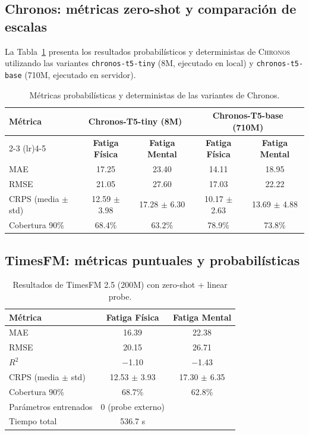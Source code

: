 \documentclass[12pt, a4paper]{article}
\newcommand{\code}[1]{\texttt{#1}}
\newcommand{\chronos}{\textsc{Chronos}}
\begin{document}
\subsection{Chronos: métricas zero-shot y comparación de escalas}

La Tabla~\ref{tab:chronos_metricas} presenta los resultados probabilísticos y deterministas de \chronos{} utilizando las variantes \code{chronos-t5-tiny} (8M, ejecutado en local) y \code{chronos-t5-base} (710M, ejecutado en servidor).

\begin{table}[H]
\centering
\caption{Métricas probabilísticas y deterministas de las variantes de Chronos.}
\label{tab:chronos_metricas}
\small
\begin{tabular}{@{}lcccc@{}}
\toprule
\multirow{2}{*}{\textbf{Métrica}} & \multicolumn{2}{c}{\textbf{Chronos-T5-tiny (8M)}} & \multicolumn{2}{c}{\textbf{Chronos-T5-base (710M)}} \\
\cmidrule(lr){2-3} \cmidrule(lr){4-5}
& \textbf{Fatiga Física} & \textbf{Fatiga Mental} & \textbf{Fatiga Física} & \textbf{Fatiga Mental} \\
\midrule
MAE & 17.25 & 23.40 & 14.11 & 18.95 \\
RMSE & 21.05 & 27.60 & 17.03 & 22.22 \\
CRPS (media $\pm$ std) & 12.59 $\pm$ 3.98 & 17.28 $\pm$ 6.30 & 10.17 $\pm$ 2.63 & 13.69 $\pm$ 4.88 \\
Cobertura 90\% & 68.4\% & 63.2\% & 78.9\% & 73.8\% \\
\bottomrule
\end{tabular}
\end{table}


\subsection{TimesFM: métricas puntuales y probabilísticas}

\begin{table}[H]
\centering
\caption{Resultados de TimesFM 2.5 (200M) con zero-shot + linear probe.}
\label{tab:timesfm_resultados}
\small
\begin{tabular}{@{}lcc@{}}
\toprule
\textbf{Métrica} & \textbf{Fatiga Física} & \textbf{Fatiga Mental} \\
\midrule
MAE & 16.39 & 22.38 \\
RMSE & 20.15 & 26.71 \\
$R^2$ & $-$1.10 & $-$1.43 \\
\midrule
CRPS (media $\pm$ std) & 12.53 $\pm$ 3.93 & 17.30 $\pm$ 6.35 \\
Cobertura 90\% & 68.7\% & 62.8\% \\
\midrule
Parámetros entrenados & 0 (probe externo) & \\
Tiempo total & 536.7 s & \\
\bottomrule
\end{tabular}
\end{table}
\end{document}
